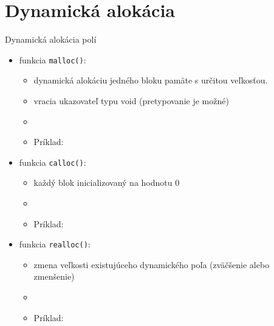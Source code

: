 \documentclass[xcolor=dvipsnames]{beamer}
\begin{document}
\section{Dynamická alokácia} \label{dyn_alloc}
\begin{frame}{Dynamická alokácia polí}

\begin{itemize}
    \item funkcia \texttt{malloc()}:
    \begin{itemize}
        \item dynamická alokáciu jedného bloku pamäte s určitou veľkosťou. 
        \item vracia ukazovateľ typu void (pretypovanie je možné)
        \item \footnotesize\texttt{\color{blue}{ptr = (typ\_pretypovania*) malloc(velkosť\_v\_bytoch)}}
        \item Príklad: \footnotesize\texttt{\color{red}{ptr = (int*)malloc(size * sizeof(int))}}
    \end{itemize}
    \item funkcia \texttt{calloc()}:
    \begin{itemize}
        \item každý blok inicializovaný na hodnotu 0
        \item \footnotesize\texttt{\color{blue}{ptr = (typ\_pretypovania*) calloc(pocet, velkosť\_prvku)}}
        \item Príklad: \footnotesize\texttt{\color{red}{ptr = (int*) calloc(5, sizeof(float))}}
    \end{itemize}
    \item funkcia \texttt{realloc()}:
    \begin{itemize}
        \item zmena veľkosti existujúceho dynamického poľa (zväčšenie alebo zmenšenie)
        \item \footnotesize\texttt{\color{blue}{ptr = realloc(ptr, nová\_veľkosť\_v\_bytoch)}}
        \item Príklad: \footnotesize\texttt{\color{red}{ptr = realloc(ptr, 6);}}
    \end{itemize}
\end{itemize}
\end{frame}
\end{document}
